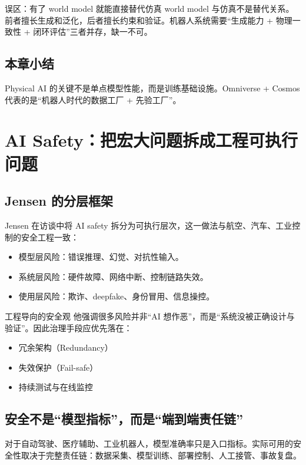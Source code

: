 \documentclass[a4paper]{article}
\begin{document}
\begin{warningbox}{误区：有了 world model 就能直接替代仿真}
world model 与仿真不是替代关系。前者擅长生成和泛化，后者擅长约束和验证。机器人系统需要“生成能力 + 物理一致性 + 闭环评估”三者并存，缺一不可。
\end{warningbox}

\subsection{本章小结}
Physical AI 的关键不是单点模型性能，而是训练基础设施。Omniverse + Cosmos 代表的是“机器人时代的数据工厂 + 先验工厂”。

\section{AI Safety：把宏大问题拆成工程可执行问题}

\subsection{Jensen 的分层框架}

Jensen 在访谈中将 AI safety 拆分为可执行层次，这一做法与航空、汽车、工业控制的安全工程一致：
\begin{itemize}
    \item 模型层风险：错误推理、幻觉、对抗性输入。
    \item 系统层风险：硬件故障、网络中断、控制链路失效。
    \item 使用层风险：欺诈、deepfake、身份冒用、信息操控。
\end{itemize}

\begin{importantbox}{工程导向的安全观}
他强调很多风险并非“AI 想作恶”，而是“系统没被正确设计与验证”。因此治理手段应优先落在：
\begin{itemize}
    \item 冗余架构（Redundancy）
    \item 失效保护（Fail-safe）
    \item 持续测试与在线监控
\end{itemize}
\end{importantbox}

\subsection{安全不是“模型指标”，而是“端到端责任链”}

对于自动驾驶、医疗辅助、工业机器人，模型准确率只是入口指标。实际可用的安全性取决于完整责任链：数据采集、模型训练、部署控制、人工接管、事故复盘。
\end{document}

